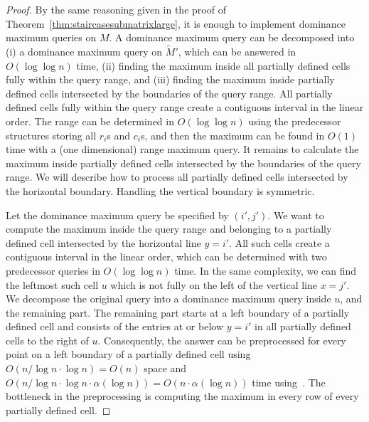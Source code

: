 \documentclass{llncs}
\begin{document}
\begin{proof}
By the same reasoning given in the proof of Theorem~\ref{thm:staircasesubmatrixlarge}, it is enough
to implement dominance maximum queries on $M$. A dominance maximum query can be
decomposed into (i) a dominance maximum query on $\widetilde M'$, which can be answered
in $O(\log\log n)$ time, (ii) finding the maximum inside all partially defined cells fully within
the query range, and (iii) finding the maximum inside partially defined cells intersected by the
boundaries of the query range. All partially defined cells fully within the query range create
a contiguous interval in the linear order. The range can be determined in $O(\log\log n)$
using the predecessor structures storing all $r_{i}$s and $c_{i}$s, and then the maximum can
be found in $O(1)$ time with a (one dimensional) range maximum query. It remains to calculate the maximum inside partially defined cells
intersected by the boundaries of the query range. We will describe how to process all partially
defined cells intersected by the horizontal boundary. Handling the vertical boundary is symmetric.

Let the dominance maximum query be specified by $(i',j')$. We want to compute the maximum
inside the query range and belonging to a partially defined cell intersected by the horizontal line $y=i'$.
All such cells create a contiguous interval in the linear order, which can be determined
with two predecessor queries in $O(\log\log n)$ time. In the same complexity, we can find
the leftmost such cell $u$ which is not fully on the left of the vertical line $x=j'$. We decompose
the original query into a dominance maximum query inside $u$, and the remaining
part. The remaining part starts at a left boundary of a partially defined cell and consists
of the entries at or below $y=i'$ in all partially defined cells to
the right of $u$.
Consequently, the answer can be preprocessed
for every point on a left boundary of a partially defined cell using $O(n/\log n \cdot \log n)=O(n)$
space and $O(n/\log n \cdot \log n \cdot \alpha(\log n))=O(n\cdot \alpha(\log n))$ time using~\cite{KK89}.
The bottleneck in the preprocessing is computing the maximum in every row of every
partially defined cell.


\end{proof}
\end{document}
